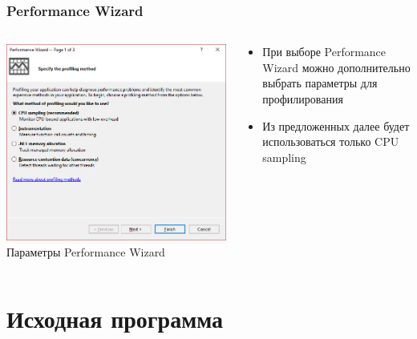 \documentclass[10pt]{beamer}
\begin{document}
\begin{frame}%
\frametitle{Performance Wizard}

\begin{columns}[c]

\begin{center}
  \includegraphics[width=\textwidth]{res/img/AnalysisTargetWizard.png}
  Параметры Performance Wizard
\end{center}

\begin{block}{}
\begin{itemize}
  \item При выборе Performance Wizard можно дополнительно выбрать параметры для профилирования
  \item Из предложенных далее будет использоваться только CPU sampling
\end{itemize}
\end{block}

\end{columns}

\end{frame}


\section{Исходная программа}
\end{document}
